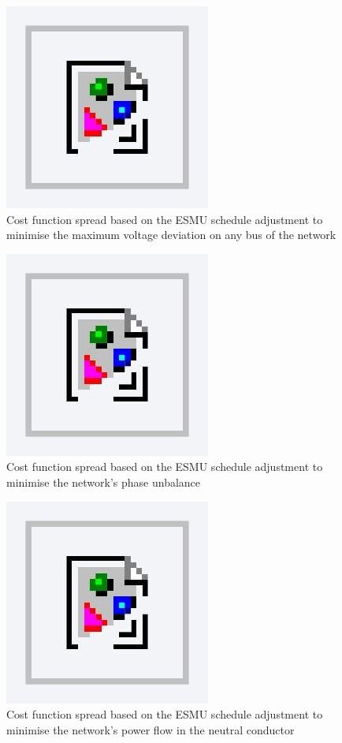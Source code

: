 \begin{figure}\centering
	\includegraphics{foo} %
	\caption{Cost function spread based on the ESMU schedule adjustment to minimise the maximum voltage deviation on any bus of the network}
\end{figure}

\begin{figure}\centering
	\includegraphics{foo} %
	\caption{Cost function spread based on the ESMU schedule adjustment to minimise the network's phase unbalance}
\end{figure}

\begin{figure}\centering
	\includegraphics{foo} %
	\caption{Cost function spread based on the ESMU schedule adjustment to minimise the network's power flow in the neutral conductor}
\end{figure}

